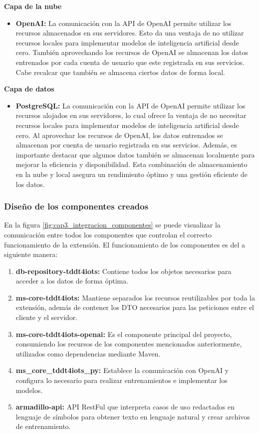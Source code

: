 \textbf{Capa de la nube}

\begin{itemize}
	\item \textbf{OpenAI:} La comunicación con la API de OpenAI permite utilizar los recursos almacenados en sus servidores. Esto da una ventaja de no utilizar recursos locales para implementar modelos de inteligencia artificial desde cero. También aprovechando los recursos de OpenAI se almacenan los datos entrenados por cada cuenta de usuario que este registrada en sus servicios. Cabe recalcar que también se almacena ciertos datos de forma local. 
\end{itemize}

\textbf{Capa de datos}

\begin{itemize}
	\item \textbf{PostgreSQL:} La comunicación con la API de OpenAI permite utilizar los recursos alojados en sus servidores, lo cual ofrece la ventaja de no necesitar recursos locales para implementar modelos de inteligencia artificial desde cero. Al aprovechar los recursos de OpenAI, los datos entrenados se almacenan por cuenta de usuario registrada en sus servicios. Además, es importante destacar que algunos datos también se almacenan localmente para mejorar la eficiencia y disponibilidad. Esta combinación de almacenamiento en la nube y local asegura un rendimiento óptimo y una gestión eficiente de los datos.
\end{itemize}

\subsubsection{Diseño de los componentes creados}

En la figura \ref{fig:cap3_integracion_componentes} se puede visualizar la comunicación entre todos los componentes que controlan el correcto funcionamiento de la extensión. El funcionamiento de los componentes es del a siguiente manera:

\begin{enumerate}
	\item \textbf{db-repository-tddt4iots:} Contiene todos los objetos necesarios para acceder a los datos de forma óptima.
	\item \textbf{ms-core-tddt4iots:} Mantiene separados los recursos reutilizables por toda la extensión, además de contener los DTO necesarios para las peticiones entre el cliente y el servidor.
	\item \textbf{ms-core-tddt4iots-openai:} Es el componente principal del proyecto, consumiendo los recursos de los componentes mencionados anteriormente, utilizados como dependencias mediante Maven.
	\item \textbf{ms\_core\_tddt4iots\_py:} Establece la comunicación con OpenAI y configura lo necesario para realizar entrenamientos e implementar los modelos.
	\item \textbf{armadillo-api:} API RestFul que interpreta casos de uso redactados en lenguaje de símbolos para obtener texto en lenguaje natural y crear archivos de entrenamiento.
\end{enumerate}

